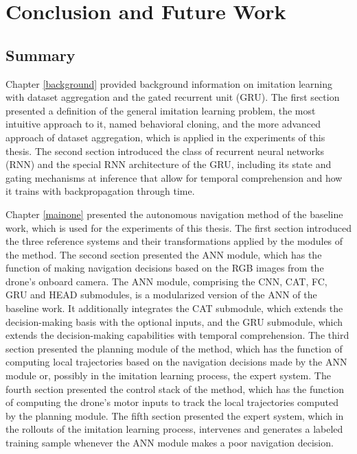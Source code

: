 \chapter{Conclusion and Future Work}
\label{conclusion}
\section{Summary}

Chapter \ref{background} provided background information on imitation learning with dataset aggregation 
and the gated recurrent unit (GRU). The first section presented a definition of the general imitation learning problem, 
the most intuitive approach to it, named behavioral cloning, and the more advanced approach of dataset aggregation, 
which is applied in the experiments of this thesis. The second section introduced the class of 
recurrent neural networks (RNN) and the special RNN architecture of the GRU, including its state and gating mechanisms 
at inference that allow for temporal comprehension and how it trains with backpropagation through time. 

Chapter \ref{mainone} presented the autonomous navigation method of the baseline work, 
which is used for the experiments of this thesis. The first section introduced the three reference systems and 
their transformations applied by the modules of the method. The second section presented the ANN module, 
which has the function of making navigation decisions based on the RGB images from the drone's onboard camera. 
The ANN module, comprising the CNN, CAT, FC, GRU and HEAD submodules, is a modularized version of the ANN of 
the baseline work. It additionally integrates the CAT submodule, which extends the decision-making basis with 
the optional inputs, and the GRU submodule, which extends the decision-making capabilities with temporal comprehension. 
The third section presented the planning module of the method, which has the function of computing local 
trajectories based on the navigation decisions made by the ANN module or, possibly in the imitation learning process, 
the expert system. The fourth section presented the control stack of the method, which has the function of computing 
the drone's motor inputs to track the local trajectories computed by the planning module. The fifth section presented 
the expert system, which in the rollouts of the imitation learning process, intervenes and generates a labeled training 
sample whenever the ANN module makes a poor navigation decision. 

